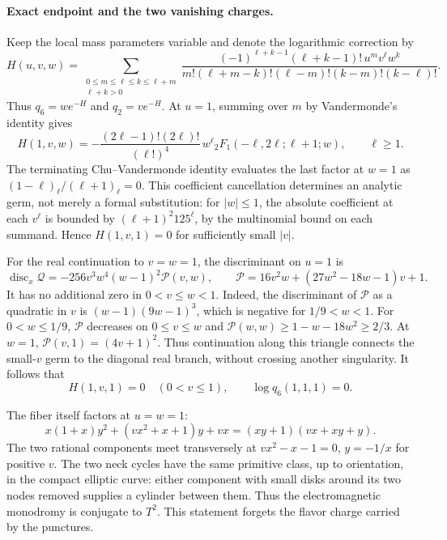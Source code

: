 \paragraph{Exact endpoint and the two vanishing charges.}
Keep the local mass parameters variable and denote the logarithmic
correction by
\begin{equation}
 H(u,v,w)=\sum_{\substack{0\leq m\leq\ell\leq k\leq\ell+m\\\ell+k>0}}
 \frac{(-1)^{\ell+k-1}(\ell+k-1)!\,u^mv^\ell w^k}
 {m!(\ell+m-k)!(\ell-m)!(k-m)!(k-\ell)!}.
 \label{eq:x9-local-mass-log}
\end{equation}
Thus $q_6=w e^{-H}$ and $q_2=v e^{-H}$.
At $u=1$, summing over $m$ by Vandermonde's identity gives
\begin{equation}
 [v^\ell]H(1,v,w)=
 -\frac{(2\ell-1)!(2\ell)!}{(\ell!)^4}\,w^\ell
 {}_2F_1(-\ell,2\ell;\ell+1;w),\qquad \ell\geq1.
 \label{eq:x9-local-endpoint-polynomial}
\end{equation}
The terminating Chu--Vandermonde identity
\cite[eq.~15.4.24]{DLMF:Hypergeometric} evaluates the last factor
at $w=1$ as $(1-\ell)_\ell/(\ell+1)_\ell=0$.
This coefficient cancellation determines an analytic germ, not
merely a formal substitution: for $|w|\leq1$, the absolute
coefficient at each $v^\ell$ is bounded by
$(\ell+1)^2 125^\ell$, by the multinomial bound on each summand.
Hence $H(1,v,1)=0$ for sufficiently small $|v|$.

For the real continuation to $v=w=1$, the discriminant
on $u=1$ is
\begin{equation}
 \operatorname{disc}_x\mathcal Q
 =-256v^3w^4(w-1)^2\mathcal P(v,w),\qquad
 \mathcal P=16v^2w+(27w^2-18w-1)v+1.
 \label{eq:x9-local-root-wall-discriminant}
\end{equation}
It has no additional zero in $0<v\leq w<1$. Indeed,
the discriminant of $\mathcal P$ as a quadratic in $v$ is
$(w-1)(9w-1)^3$, which is negative for $1/9<w<1$.
For $0<w\leq1/9$, $\mathcal P$ decreases on $0\leq v\leq w$
and $\mathcal P(w,w)\geq1-w-18w^2\geq2/3$.
At $w=1$, $\mathcal P(v,1)=(4v+1)^2$.
Thus continuation along this triangle connects the small-$v$
germ to the diagonal real branch,
without crossing another singularity. It follows that
\begin{equation}
 H(1,v,1)=0\quad(0<v\leq1),\qquad
 \log q_6(1,1,1)=0.
 \label{eq:x9-local-exact-endpoint}
\end{equation}

The fiber itself factors at $u=w=1$:
\begin{equation}
 x(1+x)y^2+(vx^2+x+1)y+vx
 =(xy+1)(vx+xy+y).
 \label{eq:x9-local-two-components}
\end{equation}
The two rational components meet transversely at
$vx^2-x-1=0$, $y=-1/x$ for positive $v$.
The two neck cycles have the same primitive class, up to orientation,
in the compact elliptic curve: either component with small disks
around its two nodes removed supplies a cylinder between them.
Thus the electromagnetic monodromy is conjugate to $T^2$.
This statement forgets the flavor charge carried by the punctures.

